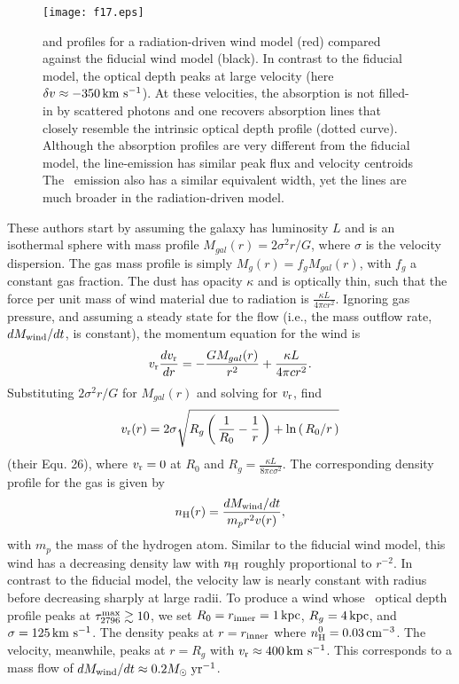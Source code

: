 \documentclass[]{emulateapj}
\begin{document}
\begin{figure}
\texttt{[image: f17.eps]}
\caption{
 and 
profiles for a radiation-driven wind model (red) compared against the
fiducial wind model (black).  In contrast to the fiducial model, the
optical depth peaks at large velocity (here $\delta v
\approx -350 \, {\rm km~s^{-1}}$).  At these velocities, the absorption is not
filled-in by scattered photons and one recovers absorption lines
that closely resemble the intrinsic optical depth profile (dotted
curve).  Although the  absorption profiles are very
different from the fiducial model, the  line-emission has
similar peak flux and velocity centroids 
The \feiis\ emission also has a similar
equivalent width, yet the lines are much broader in the
radiation-driven model. 
}
\label{fig:rad_spec}
\end{figure}


These authors start by assuming the galaxy has luminosity $L$ and is an isothermal sphere
with mass profile $M_{gal}(r) = 2\sigma^2r/G$, where $\sigma$ is the
velocity dispersion.  The gas mass profile is
simply $M_g(r) = f_g M_{gal}(r)$, with $f_g$ a constant gas fraction.  
The dust has opacity $\kappa$ and is optically thin, such that the force per unit mass of wind
material due to radiation is $\frac{\kappa L}{4\pi c r^2}$.
Ignoring gas pressure, and assuming a steady state for the flow (i.e.,
the mass outflow rate, $dM_{\rm wind}/dt$, is constant), the momentum
equation for the wind is 
\begin{equation}
v_{\rm r} \frac{dv_{\rm r}}{dr} = -\frac{GM_{gal}(r)}{r^2} + \frac{\kappa L}{4\pi c r^2}.
\end{equation}
Substituting $2\sigma^2 r/G$ for $M_{gal}(r)$ and solving for $v_{\rm r}$,
\citet{mqt05} find
\begin{equation}
v_{\rm r}(r) = 2\sigma \sqrt{R_g \left ( \, \frac{1}{R_0} - \frac{1}{r} \, \right )
   + \ln\left ( \, R_0/r \, \right ) }
\end{equation}
(their Equ. 26),
where $v_{\rm r} = 0$ at $R_0$ and $R_g = \frac{\kappa L}{8\pi c \sigma^2}$.
The corresponding density profile for the gas is given by
\begin{equation}
n_{\rm H}(r) = \frac{dM_{\rm wind}/dt}{m_p r^2 v(r)}, 
\end{equation}
with $m_p$ the mass of the hydrogen atom.
Similar to the fiducial wind model, this wind has a decreasing density
law with $n_{\rm H}$ roughly proportional to $r^{-2}$. 
In contrast to the fiducial model, the velocity law is nearly
constant with radius before decreasing sharply at large radii.
To produce a wind whose \mgiia\ optical depth profile peaks at 
$\tau_{2796}^{\rm max} \gtrsim 10$, we set $R_0 = r_{\rm inner} =
1\,\rm kpc$, $R_g=4\,\rm kpc$, and $\sigma = 125 \, {\rm km~s^{-1}}$.  The density
peaks at $r=r_{\rm inner}$ where $n_{\rm H}^0 = 0.03
\, {\rm cm^{-3}}$.  The velocity, meanwhile, peaks at $r=R_g$ with $v_{\rm r}
\approx 400 \, {\rm km~s^{-1}}$.  This corresponds to a mass flow of
$dM_{\rm wind}/dt \approx 0.2 M_\odot\; \rm yr^{-1}$.  
\end{document}
